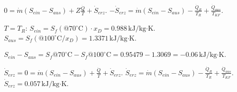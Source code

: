 \( 0 = \dot{m}(S_{ein} - S_{aus}) + Z \frac{\dot{Q}}{T} + \dot{S}_{erz} \).  
\( -\dot{S}_{erz} = \dot{m}(S_{ein} - S_{aus}) - \frac{\dot{Q}_{R}}{T_{R}} + \frac{\dot{Q}_{aus}}{T_{KF}} \).  

\( T = T_{R} \):  
\( S_{ein} = S_{f}(@70^\circ \text{C}) \cdot x_{D} = 0.988 \, \text{kJ/kg·K} \).  
\( S_{aus} = S_{f}(@100^\circ \text{C}/x_{D}) = 1.3371 \, \text{kJ/kg·K} \).  

\( S_{ein} - S_{aus} = S_{f}@70^\circ \text{C} - S_{f}@100^\circ \text{C} = 0.95479 - 1.3069 = -0.06 \, \text{kJ/kg·K} \).  

\( \dot{S}_{erz} = 0 = \dot{m}(S_{ein} - S_{aus}) + \frac{\dot{Q}}{T} + \dot{S}_{erz} \).  
\( \dot{S}_{erz} = \dot{m}(S_{ein} - S_{aus}) - \frac{\dot{Q}_{R}}{T_{R}} + \frac{\dot{Q}_{aus}}{T_{KF}} \).  
\( \dot{S}_{erz} = 0.057 \, \text{kJ/kg·K} \).
